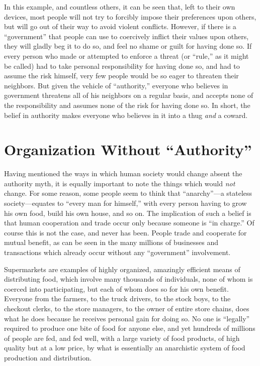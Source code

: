 \documentclass{book}
\begin{document}
In this example, and countless others, it can be seen that, left to their own devices, most people will not try to forcibly impose their preferences upon others, but will go out of their way to avoid violent conflicts. However, if there is a \enquote{government} that people can use to coercively inflict their values upon others, they will gladly beg it to do so, and feel no shame or guilt for having done so. If every person who made or attempted to enforce a threat (or \enquote{rule,} as it might be called) had to take personal responsibility for having done so, and had to assume the risk himself, very few people would be so eager to threaten their neighbors. But given the vehicle of \enquote{authority,} everyone who believes in government threatens all of his neighbors on a regular basis, and accepts none of the responsibility and assumes none of the risk for having done so. In short, the belief in authority makes everyone who believes in it into a thug \emph{and} a coward.

\section{Organization Without \enquote{Authority}}

Having mentioned the ways in which human society would change absent the authority myth, it is equally important to note the things which would \emph{not} change. For some reason, some people seem to think that \enquote{anarchy}---a stateless society---equates to \enquote{every man for himself,} with every person having to grow his own food, build his own house, and so on. The implication of such a belief is that human cooperation and trade occur only because someone is \enquote{in charge.} Of course this is not the case, and never has been. People trade and cooperate for mutual benefit, as can be seen in the many millions of businesses and transactions which already occur without any \enquote{government} involvement.

Supermarkets are examples of highly organized, amazingly efficient means of distributing food, which involve many thousands of individuals, none of whom is coerced into participating, but each of whom does so for his own benefit. Everyone from the farmers, to the truck drivers, to the stock boys, to the checkout clerks, to the store managers, to the owner of entire store chains, does what he does because he receives personal gain for doing so. No one is \enquote{legally} required to produce one bite of food for anyone else, and yet hundreds of millions of people are fed, and fed well, with a large variety of food products, of high quality but at a low price, by what is essentially an anarchistic system of food production and distribution.
\end{document}
